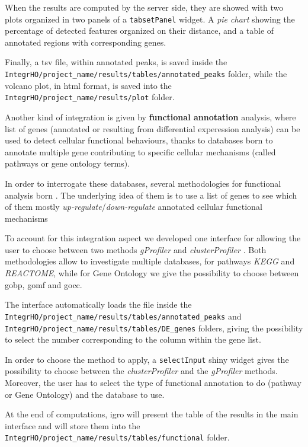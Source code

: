 When the results are computed by the server side, they are showed with two plots organized in two panels of a \lstinline!tabsetPanel! widget. 
A \textit{pie chart} showing the percentage of detected features organized on their distance, and a table of annotated regions with corresponding genes.

Finally, a \gls{tsv} file, within annotated peaks, is saved inside the  \lstinline!IntegrHO/project_name/results/tables/annotated_peaks! folder, while the volcano plot, in \gls{html} format, is saved into the \lstinline!IntegrHO/project_name/results/plot! folder.

Another kind of integration is given by \textbf{functional annotation} analysis, where list of genes (annotated or resulting from differential experession analysis) can be used to detect cellular functional behaviours, thanks to databases born to annotate multiple gene contributing to specific cellular mechanisms (called pathways or gene ontology terms).

In order to interrogate these databases, several methodologies for functional analysis born \cite{Subramanian2005, Sales2012a, Reimand2016, Yu2012, Huang2009}.
The underlying idea of them is to use a list of genes to see which of them mostly \textit{up-regulate}/\textit{down-regulate} annotated cellular functional mechanisms

To account for this integration aspect we developed one interface for allowing the user to choose between two methods \textit{gProfiler} \cite{Reimand2016} and \textit{clusterProfiler} \cite{Yu2012}.
Both methodologies allow to investigate multiple databases, for pathways \textit{KEGG} and \textit{REACTOME}, while for Gene Ontology we give the possibility to choose between \gls{gobp}, \gls{gomf} and \gls{gocc}.

The interface automatically loads the file inside the \lstinline!IntegrHO/project_name/results/tables/annotated_peaks! and \lstinline!IntegrHO/project_name/results/tables/DE_genes! folders, giving the possibility to select the number corresponding to the column within the gene list.

In order to choose the method to apply, a \lstinline!selectInput! shiny widget gives the possibility to choose between the \textit{clusterProfiler} and the \textit{gProfiler} methods.
Moreover, the user has to select the type of functional annotation to do (pathway or Gene Ontology) and the database to use.

At the end of computations, \gls{igro} will present the table of the results in the main interface and will store them into the  \lstinline!IntegrHO/project_name/results/tables/functional! folder.

